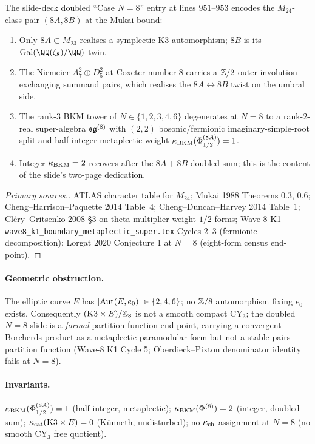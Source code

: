 \begin{theorem}[$N=8$ Mukai-saturation doubled-entry
content]\ClaimStatusTheorem{}
\label{wn:thm:wave11-x3-N8-doubled-entry}
The slide-deck doubled ``Case $N=8$'' entry at lines $951$--$953$
encodes the $M_{24}$-class pair $(8A, 8B)$ at the Mukai bound:
\begin{enumerate}\itemsep=0pt
\item[(a)] Only $8A\subset M_{23}$ realises a symplectic
K3-automorphism; $8B$ is its $\mathrm{Gal}(\QQ(\zeta_8)/\QQ)$ twin.
\item[(b)] The Niemeier $A_7^2\oplus D_5^2$ at Coxeter number $8$
carries a $\mathbb{Z}/2$ outer-involution exchanging summand pairs, which
realises the $8A\leftrightarrow 8B$ twist on the umbral side.
\item[(c)] The rank-$3$ BKM tower of $N\in\{1,2,3,4,6\}$
degenerates at $N=8$ to a rank-$2$-real super-algebra
$\mathfrak{sg}^{(8)}$ with $(2,2)$ bosonic/fermionic imaginary-simple-root
split and half-integer metaplectic weight
$\kappa_{\mathrm{BKM}}(\Phi^{(8A)}_{1/2})=1$.
\item[(d)] Integer $\kappa_{\mathrm{BKM}}=2$ recovers after the $8A+8B$ doubled
sum; this is the content of the slide's two-page dedication.
\end{enumerate}
\end{theorem}
\begin{proof}[Primary sources.]
ATLAS character table for $M_{24}$; Mukai 1988 Theorems 0.3, 0.6;
Cheng--Harrison--Paquette 2014 Table~4; Cheng--Duncan--Harvey 2014
Table~1; Cl\'ery--Gritsenko 2008 \S3 on theta-multiplier weight-$1/2$
forms; Wave-8 K1 \texttt{wave8\_k1\_boundary\_metaplectic\_super.tex}
Cycles 2--3 (fermionic decomposition); Lorgat 2020 Conjecture 1 at
$N=8$ (eight-form census end-point).
\end{proof}

\paragraph{Geometric obstruction.} The elliptic curve $E$ has
$|\mathrm{Aut}(E, e_0)|\in\{2,4,6\}$; no $\mathbb{Z}/8$ automorphism fixing $e_0$
exists. Consequently $(\mathrm{K3}\times E)/\mathbb{Z}_8$ is not a smooth compact
CY$_3$; the doubled $N=8$ slide is a \emph{formal}
partition-function end-point, carrying a convergent Borcherds
product as a metaplectic paramodular form but not a stable-pairs
partition function (Wave-8 K1 Cycle 5; Oberdieck--Pixton denominator
identity fails at $N=8$).

\paragraph{Invariants.} $\kappa_{\mathrm{BKM}}(\Phi^{(8A)}_{1/2})=1$
(half-integer, metaplectic); $\kappa_{\mathrm{BKM}}(\Phi^{(8)})=2$ (integer,
doubled sum); $\kappa_{\mathrm{cat}}(\mathrm{K3}\times E)=0$ (K\"unneth, undisturbed); no
$\kappa_{\mathrm{ch}}$ assignment at $N=8$ (no smooth CY$_3$ free quotient).

